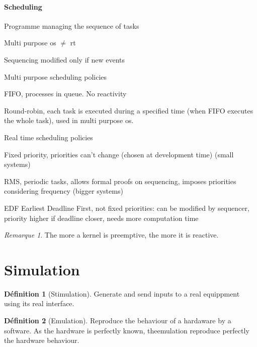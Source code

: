 \documentclass[10pt]{article}
\theoremstyle{plain}
\theoremstyle{definition}
\newtheorem{defn}{Définition}
\theoremstyle{remark}
\newtheorem{rem}{Remarque}
\begin{document}
\paragraph{Scheduling}
\begin{compactitem}
	\item Programme managing the sequence of tasks
	\item Multi purpose os $\ne$ rt
	\item Sequencing modified only if new events
	\item Multi purpose scheduling policies
		\begin{compactitem}
			\item FIFO, processes in queue. No reactivity
			\item Round-robin, each task is executed during a specified time
				(when FIFO executes the whole task), used in multi purpose os.
		\end{compactitem}
	\item Real time scheduling policies
		\begin{compactitem}
			\item Fixed priority, priorities can't change (chosen at development
				time) (small systems)
			\item RMS, periodic tasks, allows formal proofs on
				sequencing, imposes priorities considering frequency (bigger
				systems)
			\item EDF Earliest Deadline First, not fixed priorities: can be
				modified by sequencer, priority higher if deadline closer, needs
				more computation time
		\end{compactitem}
\end{compactitem}
\begin{rem}
	The more a kernel is preemptive, the more it is reactive.
\end{rem}

\section{Simulation}
\begin{defn}
	[Stimulation]
	Generate and send inputs to a real equippment using its real interface.
\end{defn}

\begin{defn}
	[Emulation]
	Reproduce the behaviour of a hardaware by a software. As the hardware is
	perfectly known, theemulation reproduce perfectly the hardware behaviour.
\end{defn}
\end{document}
